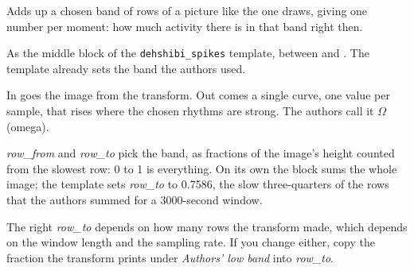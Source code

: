 Adds up a chosen band of rows of a picture like the one 
draws, giving one number per moment: how much activity there is in that band right then.

As the middle block of the \texttt{dehshibi\_spikes} template, between
 and . The
template already sets the band the authors used.

In goes the image from the transform. Out comes a single curve, one value per sample, that
rises where the chosen rhythms are strong. The authors call it $\Omega$ (omega).

\emph{row\_from} and \emph{row\_to} pick the band, as fractions of the image's height counted
from the slowest row: 0 to 1 is everything. On its own the block sums the whole image; the
template sets \emph{row\_to} to 0.7586, the slow three-quarters of the rows that the authors
summed for a 3000-second window.

The right \emph{row\_to} depends on how many rows the transform made, which depends on the
window length and the sampling rate. If you change either, copy the fraction the transform
prints under \emph{Authors' low band} into \emph{row\_to}.
